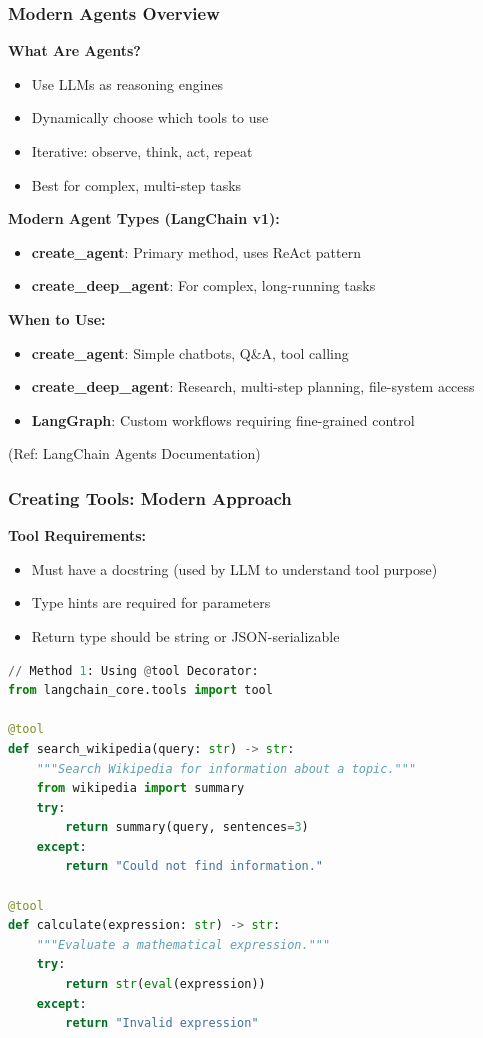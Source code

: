 \begin{frame}[fragile]\frametitle{Modern Agents Overview}

\textbf{What Are Agents?}
\begin{itemize}
\item Use LLMs as reasoning engines
\item Dynamically choose which tools to use
\item Iterative: observe, think, act, repeat
\item Best for complex, multi-step tasks
\end{itemize}

\textbf{Modern Agent Types (LangChain v1):}
\begin{itemize}
\item \textbf{create\_agent}: Primary method, uses ReAct pattern
\item \textbf{create\_deep\_agent}: For complex, long-running tasks
\end{itemize}

\textbf{When to Use:}
\begin{itemize}
\item \textbf{create\_agent}: Simple chatbots, Q\&A, tool calling
\item \textbf{create\_deep\_agent}: Research, multi-step planning, file-system access
\item \textbf{LangGraph}: Custom workflows requiring fine-grained control
\end{itemize}

{\tiny (Ref: LangChain Agents Documentation)}
\end{frame}

\begin{frame}[fragile]\frametitle{Creating Tools: Modern Approach}

\textbf{Tool Requirements:}
\begin{itemize}
\item Must have a docstring (used by LLM to understand tool purpose)
\item Type hints are required for parameters
\item Return type should be string or JSON-serializable
\end{itemize}

\begin{lstlisting}[language=python, basicstyle=\tiny]
// Method 1: Using @tool Decorator:
from langchain_core.tools import tool

@tool
def search_wikipedia(query: str) -> str:
    """Search Wikipedia for information about a topic."""
    from wikipedia import summary
    try:
        return summary(query, sentences=3)
    except:
        return "Could not find information."

@tool
def calculate(expression: str) -> str:
    """Evaluate a mathematical expression."""
    try:
        return str(eval(expression))
    except:
        return "Invalid expression"
\end{lstlisting}

\end{frame}

